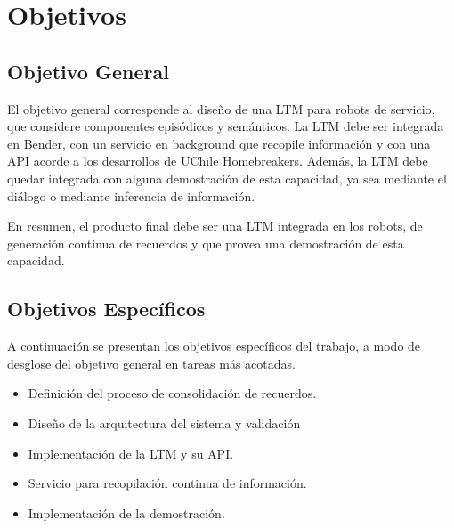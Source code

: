 


\section{Objetivos}

\subsection{Objetivo General}

El objetivo general corresponde al dise\~no de una LTM para robots de servicio, que considere componentes epis\'odicos y sem\'anticos. La LTM debe ser integrada en Bender, con un servicio en background que recopile informaci\'on y con una API acorde a los desarrollos de UChile Homebreakers. Adem\'as, la LTM debe quedar integrada con alguna demostraci\'on de esta capacidad, ya sea mediante el di\'alogo o mediante inferencia de informaci\'on.

En resumen, el producto final debe ser una LTM integrada en los robots, de generaci\'on continua de recuerdos y que provea una demostraci\'on de esta capacidad.


\subsection{Objetivos Espec\'ificos}

A continuaci\'on se presentan los objetivos espec\'ificos del trabajo, a modo de desglose del objetivo general en tareas m\'as acotadas.

\begin{itemize}
\item Definici\'on del proceso de consolidaci\'on de recuerdos.
\item Dise\~no de la arquitectura del sistema y validaci\'on
\item Implementaci\'on de la LTM y su API.
\item Servicio para recopilaci\'on continua de informaci\'on.
\item Implementaci\'on de la demostraci\'on.
\end{itemize}

